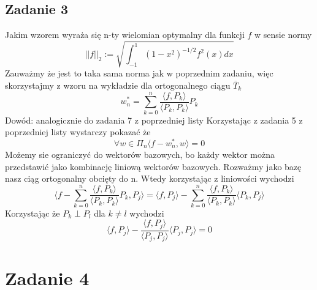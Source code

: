 \documentclass{article}
\begin{document}
\subsection*{Zadanie 3}
Jakim wzorem wyraża się n-ty wielomian optymalny dla funkcji $f$ w sensie normy
\[
  ||f||_2 := \sqrt{\int^1_{-1} 
    (1-x^2)^{-1/2} f^2 (x) dx
  }  
\]
Zauważmy że jest to taka sama norma jak w poprzednim zadaniu, więc skorzystajmy z wzoru na wykładzie dla ortogonalnego ciągu $\overline{T}_k$
\[
  w^*_n = \sum^n_{k=0} \frac{\langle f, P_k \rangle}{\langle P_k , P_k \rangle} P_k  
\]
Dowód:
analogicznie do zadania 7 z poprzedniej listy
Korzystając z zadania 5 z poprzedniej listy wystarczy pokazać że
\[ 
    \forall w \in \Pi_n \langle f - w^*_n , w \rangle = 0 
\]
Możemy sie ograniczyć do wektorów bazowych, bo każdy wektor można przedstawić jako kombinację liniową wektorów bazowych. Rozważmy jako bazę nasz ciąg ortogonalny obcięty do n.
Wtedy korzystając z liniowości wychodzi
\[
  \langle f -  \sum^n_{k=0} \frac{\langle f, P_k \rangle}{\langle P_k , P_k \rangle} P_k, P_j \rangle = \langle f, P_j \rangle - \sum^n_{k=0} \frac{\langle f, P_k \rangle}{\langle P_k , P_k \rangle}\langle  P_k, P_j \rangle
\]
Korzystając że $P_k \perp P_l$ dla $k \neq l$ wychodzi
\[
  \langle f, P_j\rangle - \frac{\langle f , P_j \rangle}{\langle P_j , P_j \rangle} \langle P_j, P_j \rangle = 0
\]
\section*{Zadanie 4}
\end{document}
